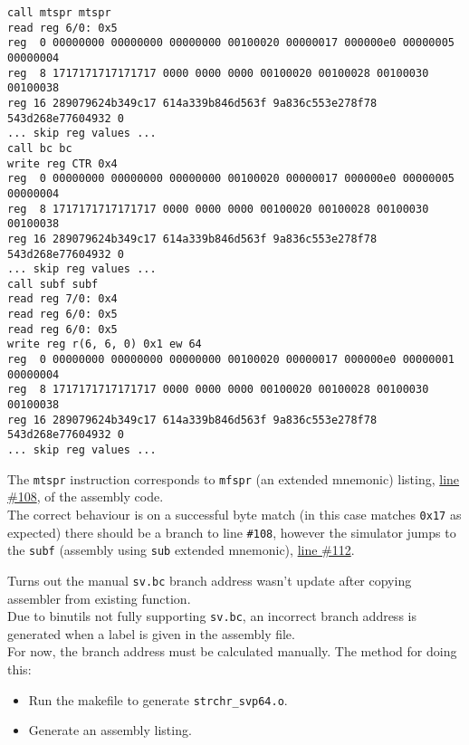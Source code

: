 \begin{verbatim}
call mtspr mtspr
read reg 6/0: 0x5
reg  0 00000000 00000000 00000000 00100020 00000017 000000e0 00000005 00000004
reg  8 1717171717171717 0000 0000 0000 00100020 00100028 00100030 00100038
reg 16 289079624b349c17 614a339b846d563f 9a836c553e278f78 543d268e77604932 0
... skip reg values ...
call bc bc
write reg CTR 0x4
reg  0 00000000 00000000 00000000 00100020 00000017 000000e0 00000005 00000004
reg  8 1717171717171717 0000 0000 0000 00100020 00100028 00100030 00100038
reg 16 289079624b349c17 614a339b846d563f 9a836c553e278f78 543d268e77604932 0
... skip reg values ...
call subf subf
read reg 7/0: 0x4
read reg 6/0: 0x5
read reg 6/0: 0x5
write reg r(6, 6, 0) 0x1 ew 64
reg  0 00000000 00000000 00000000 00100020 00000017 000000e0 00000001 00000004
reg  8 1717171717171717 0000 0000 0000 00100020 00100028 00100030 00100038
reg 16 289079624b349c17 614a339b846d563f 9a836c553e278f78 543d268e77604932 0
... skip reg values ...
\end{verbatim}

The \texttt{mtspr} instruction corresponds to \texttt{mfspr}
(an extended mnemonic) listing,
\href{https://git.vantosh.com/ngisearch/glibc-svp64/src/commit/9378006a84bdef6af85eb0f810fb62fedc62c588/svp64-port/svp64/strchr_svp64.s#L108}{line \#108},
of the assembly code.\\

The correct behaviour is on a successful byte match (in this case
matches \texttt{0x17} as expected) there should be a branch to line
\texttt{\#108}, however the simulator jumps to the \texttt{subf}
(assembly using \texttt{sub} extended mnemonic),
\href{https://git.vantosh.com/ngisearch/glibc-svp64/src/commit/9378006a84bdef6af85eb0f810fb62fedc62c588/svp64-port/svp64/strchr_svp64.s#L112}{line \#112}.\\

\label{subsubsec:wrong_val_man_addr}

Turns out the manual \texttt{sv.bc} branch address wasn't update after
copying assembler from existing function.\\

Due to binutils not fully supporting \texttt{sv.bc}, an incorrect
branch address is generated when a label is given in the assembly file.\\

For now, the branch address must be calculated manually.
The method for doing this:

\begin{itemize}
  \item Run the makefile to generate \texttt{strchr\_svp64.o}.
  \item Generate an assembly listing.
\end{itemize}

